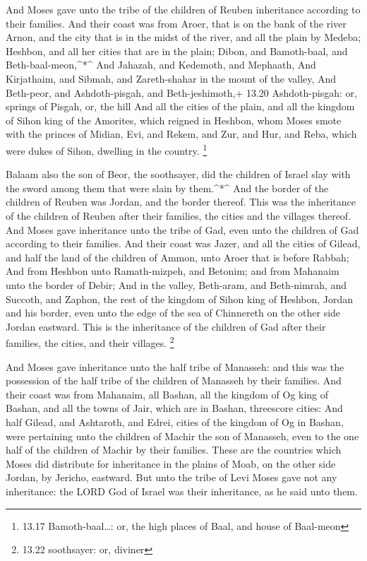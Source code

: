  And Moses gave unto the tribe of the children of Reuben
inheritance according to their families.  And their coast
was from Aroer, that is on the bank of the river Arnon, and the city
that is in the midst of the river, and all the plain by Medeba;
 Heshbon, and all her cities that are in the plain; Dibon,
and Bamoth-baal, and Beth-baal-meon,\^{}*\^{}  And Jahazah,
and Kedemoth, and Mephaath,  And Kirjathaim, and Sibmah,
and Zareth-shahar in the mount of the valley,  And
Beth-peor, and Ashdoth-pisgah, and Beth-jeshimoth,+ 13.20
Ashdoth-pisgah: or, springs of Pisgah, or, the hill  And
all the cities of the plain, and all the kingdom of Sihon king of the
Amorites, which reigned in Heshbon, whom Moses smote with the princes of
Midian, Evi, and Rekem, and Zur, and Hur, and Reba, which were dukes of
Sihon, dwelling in the country. \footnote{13.17 Bamoth-baal\ldots: or,
  the high places of Baal, and house of Baal-meon}

 Balaam also the son of Beor, the soothsayer, did the
children of Israel slay with the sword among them that were slain by
them.\^{}*\^{}  And the border of the children of Reuben
was Jordan, and the border thereof. This was the inheritance of the
children of Reuben after their families, the cities and the villages
thereof.  And Moses gave inheritance unto the tribe of Gad,
even unto the children of Gad according to their families. 
And their coast was Jazer, and all the cities of Gilead, and half the
land of the children of Ammon, unto Aroer that is before Rabbah;
 And from Heshbon unto Ramath-mizpeh, and Betonim; and from
Mahanaim unto the border of Debir;  And in the valley,
Beth-aram, and Beth-nimrah, and Succoth, and Zaphon, the rest of the
kingdom of Sihon king of Heshbon, Jordan and his border, even unto the
edge of the sea of Chinnereth on the other side Jordan eastward.
 This is the inheritance of the children of Gad after their
families, the cities, and their villages. \footnote{13.22 soothsayer:
  or, diviner}

 And Moses gave inheritance unto the half tribe of
Manasseh: and this was the possession of the half tribe of the children
of Manasseh by their families.  And their coast was from
Mahanaim, all Bashan, all the kingdom of Og king of Bashan, and all the
towns of Jair, which are in Bashan, threescore cities:  And
half Gilead, and Ashtaroth, and Edrei, cities of the kingdom of Og in
Bashan, were pertaining unto the children of Machir the son of Manasseh,
even to the one half of the children of Machir by their families.
 These are the countries which Moses did distribute for
inheritance in the plains of Moab, on the other side Jordan, by Jericho,
eastward.  But unto the tribe of Levi Moses gave not any
inheritance: the LORD God of Israel was their inheritance, as he said
unto them.

